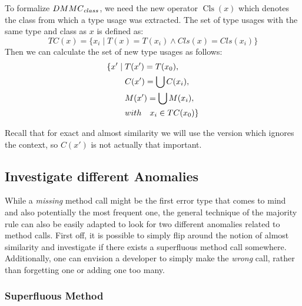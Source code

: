 To formalize $\mathnormal{DMMC}_{\mathnormal{class}}$, we need the new operator $\operatorname{Cls}(x)$ which denotes the class from which a type usage was extracted.
The set of type usages with the same type and class as $x$ is defined as:
\begin{equation*}
    TC(x) = \{ x_i \mid T(x) = T(x_i) \land Cls(x) = Cls(x_i) \}
\end{equation*}
Then we can calculate the set of new type usages as follows:
\begin{align*}
    \{ x' \mid \;  & T(x') = T(x_0),\\
                & C(x') = \bigcup{C(x_i)},\\
                & M(x') = \bigcup{M(x_i)},\\
                & \mathnormal{with} \quad x_i \in TC(x_0) \}
\end{align*}

Recall that for exact and almost similarity we will use the version which ignores the context, so $C(x')$ is not actually that important.

\subsection{Investigate different Anomalies}

While a \emph{missing} method call might be the first error type that comes to mind and also potentially the most frequent one, the general technique of the majority rule can also be easily adapted to look for two different anomalies related to method calls.
First off, it is possible to simply flip around the notion of almost similarity and investigate if there exists a superfluous method call somewhere.
Additionally, one can envision a developer to simply make the \emph{wrong} call, rather than forgetting one or adding one too many.


\subsubsection{Superfluous Method}

